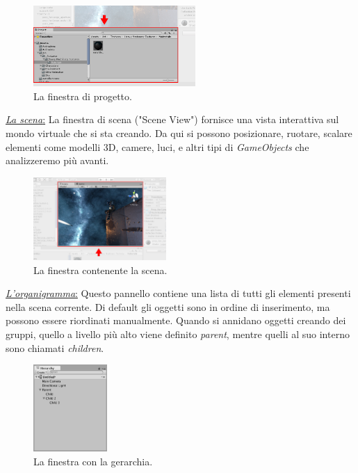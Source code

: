 \begin{figure}[H]
	\includegraphics[width=0.55\textwidth]{figure/Project}
	\centering
	\caption{La finestra di progetto.}
\end{figure}

\begin{flushleft}
	\underline{\textit{La scena}:}
	La finestra di scena ("Scene View") fornisce una vista interattiva sul mondo virtuale che si sta creando. Da qui si possono posizionare, ruotare, scalare elementi come modelli 3D, camere, luci, e altri tipi di \textit{GameObjects} che analizzeremo più avanti.
\end{flushleft}

\begin{figure}[H]
	\includegraphics[width=0.45\textwidth]{figure/Scene}
	\centering
	\caption{La finestra contenente la scena.}
\end{figure}


\begin{flushleft}
	\underline{\textit{L'organigramma}:}
	Questo pannello contiene una lista di tutti gli elementi presenti nella scena corrente. Di default gli oggetti sono in ordine di inserimento, ma possono essere riordinati manualmente. Quando si annidano oggetti creando dei gruppi, quello a livello più alto viene definito \textit{parent}, mentre quelli al suo interno sono chiamati \textit{children}. 
\end{flushleft}

\begin{figure}[H]
	\includegraphics[width=0.25\textwidth]{figure/Hierarchy}
	\centering
	\caption{La finestra con la gerarchia.}
\end{figure}

